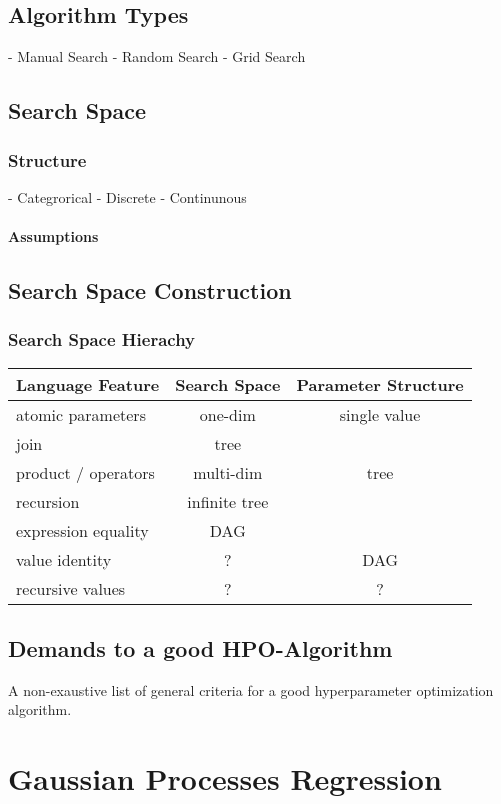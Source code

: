 \documentclass[english]{article}
\begin{document}
\subsection{Algorithm Types}
 - Manual Search
 - Random Search
 - Grid Search
\subsection{Search Space}
\subsubsection{Structure}
 - Categrorical
 - Discrete
 - Continunous
\paragraph{Assumptions}
\subsection{Search Space Construction}
\subsubsection{Search Space Hierachy}


\begin{tabular}{ l | c | c }
Language Feature & Search Space & Parameter Structure \\
\hline
atomic parameters   & one-dim          & single value \\
join                & tree             &              \\
product / operators & multi-dim        & tree         \\
recursion           & infinite tree    &              \\
expression equality & DAG              &              \\
value identity      & ?                & DAG          \\
recursive values    & ?                & ? 
\end{tabular}

\subsection{Demands to a good HPO-Algorithm}
A non-exaustive list of general criteria for a good hyperparameter optimization algorithm.

\section{Gaussian Processes Regression}
\end{document}
